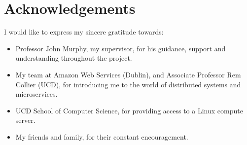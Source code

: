 \chapter*{Acknowledgements}

I would like to express my sincere gratitude towards:
\begin{itemize}
  \item Professor John Murphy, my supervisor, for his guidance, support and understanding throughout the project.
  \item My team at Amazon Web Services (Dublin), and Associate Professor Rem Collier (UCD), for introducing me
        to the world of distributed systems and microservices.
  \item UCD School of Computer Science, for providing access to a Linux compute server.
  \item My friends and family, for their constant encouragement.
\end{itemize}
